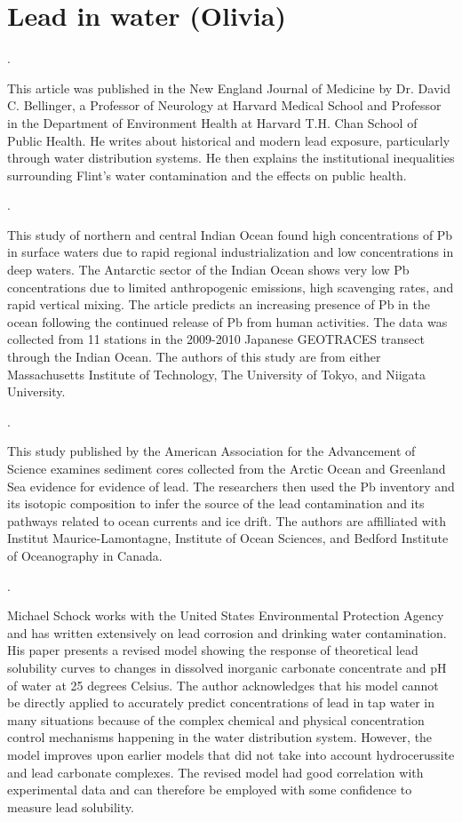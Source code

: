 \documentclass{article}\usepackage[]{graphicx}\usepackage[]{color}
\begin{document}
\section{Lead in water (Olivia)}


\noindent {} .


This article was published in the New England Journal of Medicine by Dr. David C. Bellinger, a Professor of Neurology at Harvard Medical School and Professor in the Department of Environment Health at Harvard T.H. Chan School of Public Health. He writes about historical and modern lead exposure, particularly through water distribution systems. He then explains the institutional inequalities surrounding Flint's water contamination and the effects on public health. 


\noindent {} .


This study of northern and central Indian Ocean found high concentrations of Pb in surface waters due to rapid regional industrialization and low concentrations in deep waters. The Antarctic sector of the Indian Ocean shows very low Pb concentrations due to limited anthropogenic emissions, high scavenging rates, and rapid vertical mixing. The article predicts an increasing presence of Pb in the ocean following the continued release of Pb from human activities. The data was collected from 11 stations in the 2009-2010 Japanese GEOTRACES transect through the Indian Ocean. The authors of this study are from either Massachusetts Institute of Technology, The University of Tokyo, and Niigata University. 


\noindent {} .


This study published by the American Association for the Advancement of Science examines sediment cores collected from the Arctic Ocean and Greenland Sea evidence for evidence of lead. The researchers then used the Pb inventory and its isotopic composition to infer the source of the lead contamination and its pathways related to ocean currents and ice drift. The authors are affilliated with Institut Maurice-Lamontagne, Institute of Ocean Sciences, and Bedford Institute of Oceanography in Canada.


\noindent {} .


Michael Schock works with the United States Environmental Protection Agency and has written extensively on lead corrosion and drinking water contamination. His paper presents a revised model showing the response of theoretical lead solubility curves to changes in dissolved inorganic carbonate concentrate and pH of water at 25 degrees Celsius. The author acknowledges that his model cannot be directly applied to accurately predict concentrations of lead in tap water in many situations because of the complex chemical and physical concentration control mechanisms happening in the water distribution system. However, the model improves upon earlier models that did not take into account hydrocerussite and lead carbonate complexes. The revised model had good correlation with experimental data and can therefore be employed with some confidence to measure lead solubility.
\end{document}
